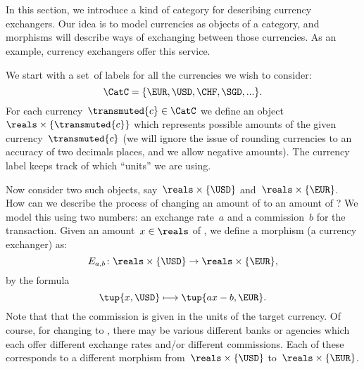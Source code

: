 \section{}
\label{sec:currency_cat}
In this section, we introduce a kind of category for describing currency exchangers. Our idea is to model currencies as objects of a category, and morphisms will describe ways of exchanging between those currencies. As an example, currency exchangers offer this service.

We start with a set~\CatC of labels for all the currencies we wish to consider:
\begin{equation*}
  \CatC = \{ \EUR, \USD, \CHF, \SGD, ... \}.
\end{equation*}
For each currency~$\transmuted{c} \in \CatC$ we define an object~$\reals \times \{\transmuted{c}\}$ which represents possible amounts of the given currency~$\transmuted{c}$ (we will ignore the issue of rounding currencies to an accuracy of two decimals places, and we allow negative amounts). The currency label keeps track of which ``units'' we are using.

Now consider two such objects, say~$\reals \times \{\USD\}$ and~$\reals \times \{\EUR\}$. How can we describe the process of changing an amount of \USD to an amount of \EUR? We model this using two numbers: an exchange rate~$a$ and a commission~$b$ for the transaction. Given an amount~$x \in \reals$ of \USD, we define a morphism (a currency exchanger) as:
\begin{equation*}
  E_{a,b} \colon \reals \times \{\USD\} \rightarrow \reals \times \{\EUR\},
\end{equation*}
by the formula
\begin{equation*}
  \tup{x, \USD} \longmapsto \tup{ax - b, \EUR}.
\end{equation*}
Note that that the commission is given in the units of the target currency. Of course, for changing \USD to \EUR, there may be various different banks or agencies which each offer different exchange rates and/or different commissions. Each of these corresponds to a different morphism from~$\reals \times \{\USD\}$ to~$\reals \times \{\EUR\}$.

